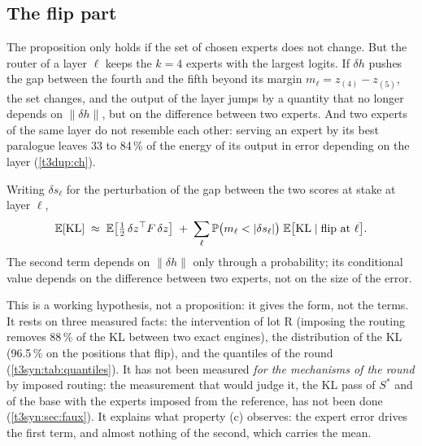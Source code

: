 \subsection{The flip part}

The proposition only holds if the set of chosen experts does not change. But the router of a layer $\ell$ keeps the $k = 4$ experts with the largest logits. If $\delta h$ pushes the gap between the fourth and the fifth beyond its margin $m_\ell = z_{(4)} - z_{(5)}$, the set changes, and the output of the layer jumps by a quantity that no longer depends on $\|\delta h\|$, but on the difference between two experts. And two experts of the same layer do not resemble each other: serving an expert by its best paralogue leaves 33 to 84\,\% of the energy of its output in error depending on the layer (\cref{t3dup:ch}).

\begin{hypothese}\label{t3syn:hyp:bascule}
Writing $\delta s_\ell$ for the perturbation of the gap between the two scores at stake at layer $\ell$,
\[
\mathbb{E}[\mathrm{KL}] \;\approx\; \mathbb{E}\bigl[\tfrac12\,\delta z^{\top}F\,\delta z\bigr] \;+\; \sum_{\ell} \mathbb{P}\bigl(m_\ell < |\delta s_\ell|\bigr)\; \mathbb{E}\bigl[\mathrm{KL} \mid \text{flip at } \ell\bigr].
\]
The second term depends on $\|\delta h\|$ only through a probability; its conditional value depends on the difference between two experts, not on the size of the error.
\end{hypothese}

This is a working hypothesis, not a proposition: it gives the form, not the terms. It rests on three measured facts: the intervention of lot R (imposing the routing removes 88\,\% of the KL between two exact engines), the distribution of the KL (96.5\,\% on the positions that flip), and the quantiles of the round (\cref{t3syn:tab:quantiles}). It has not been measured \emph{for the mechanisms of the round} by imposed routing: the measurement that would judge it, the KL pass of $S^{*}$ and of the base with the experts imposed from the reference, has not been done (\cref{t3syn:sec:faux}). It explains what property (c) observes: the expert error drives the first term, and almost nothing of the second, which carries the mean.

\begin{figure}[tbp]
\centering
\GrapheSynthDeuxParts
{}
\label{fig:t3-synth-deux-parts}
\end{figure}

